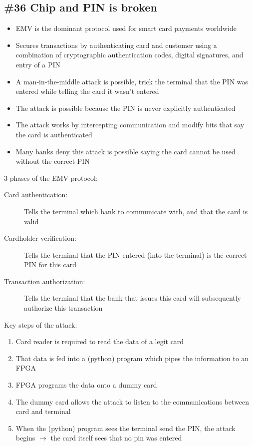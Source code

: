 \subsection{\#36 Chip and PIN is broken}
\begin{itemize}
	\item EMV is the dominant protocol used for smart card payments worldwide
	\item Secures transactions by authenticating card and customer using a combination of cryptographic authentication codes, digital signatures, and entry of a PIN
	\item A man-in-the-middle attack is possible, trick the terminal that the PIN was entered while telling the card it wasn't entered
	\item The attack is possible because the PIN is never explicitly authenticated
	\item The attack works by intercepting communication and modify bits that say the card is authenticated
	\item Many banks deny this attack is possible saying the card cannot be used without the correct PIN
\end{itemize}
3 phases of the EMV protocol:
\begin{description}
	\item[Card authentication:] Tells the terminal which bank to communicate with, and that the card is valid
	\item[Cardholder verification:] Tells the terminal that the PIN entered (into the terminal) is the correct PIN for this card
	\item[Transaction authorization:] Tells the terminal that the bank that issues this card will subsequently authorize this transaction
\end{description}
Key steps of the attack:
\begin{enumerate}
	\item Card reader is required to read the data of a legit card
	\item That data is fed into a (python) program which pipes the information to an FPGA
	\item FPGA programs the data onto a dummy card
	\item The dummy card allows the attack to listen to the communications between card and terminal
	\item When the (python) program sees the terminal send the PIN, the attack begins $\rightarrow$ the card itself sees that no pin was entered
\end{enumerate}